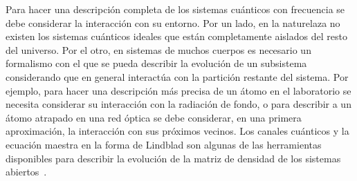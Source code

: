 %
%



Para hacer una descripción completa de los sistemas cuánticos 
con frecuencia se debe considerar la interacción con su entorno. Por un lado, 
en la naturelaza no existen los sistemas cuánticos ideales que 
están completamente aislados del resto del universo. 
Por el otro, en sistemas de muchos cuerpos es necesario un formalismo
con el que se pueda describir la evolución de un subsistema considerando
que en general interactúa con la partición restante del sistema.
Por ejemplo, para hacer una descripción más precisa de un átomo en el laboratorio se
necesita considerar su interacción con la radiación de fondo, 
o para describir a un átomo atrapado en una red óptica se debe considerar, 
en una primera aproximación, la interacción con sus próximos vecinos.
Los canales cuánticos y la ecuación maestra en la forma de Lindblad son algunas
de las herramientas disponibles para describir la evolución de la 
matriz de densidad de los sistemas abiertos~\cite{nielsen_chuang_2011}. 




